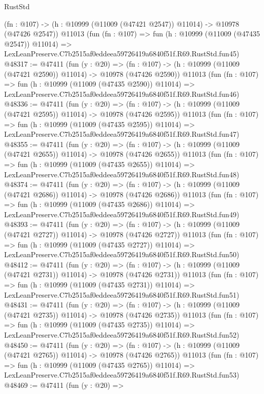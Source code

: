 \begin{lexlean}{RustStd}
\begin{coremodule}
    (fn : @107) -> (h : @10999 (@11009 (@47421 @2547)) @11014) -> @10978 (@47426 @2547))
    @11013
    (fun (fn : @107) =>
    fun (h : @10999 (@11009 (@47435 @2547)) @11014) =>
    LexLeanPreserve.C7b2515af0eddeea59726419a6840f51f.R69.RustStd.fun45)
@48317 := @47411
    (fun (y : @20) =>
    (fn : @107) -> (h : @10999 (@11009 (@47421 @2590)) @11014) -> @10978 (@47426 @2590))
    @11013
    (fun (fn : @107) =>
    fun (h : @10999 (@11009 (@47435 @2590)) @11014) =>
    LexLeanPreserve.C7b2515af0eddeea59726419a6840f51f.R69.RustStd.fun46)
@48336 := @47411
    (fun (y : @20) =>
    (fn : @107) -> (h : @10999 (@11009 (@47421 @2595)) @11014) -> @10978 (@47426 @2595))
    @11013
    (fun (fn : @107) =>
    fun (h : @10999 (@11009 (@47435 @2595)) @11014) =>
    LexLeanPreserve.C7b2515af0eddeea59726419a6840f51f.R69.RustStd.fun47)
@48355 := @47411
    (fun (y : @20) =>
    (fn : @107) -> (h : @10999 (@11009 (@47421 @2655)) @11014) -> @10978 (@47426 @2655))
    @11013
    (fun (fn : @107) =>
    fun (h : @10999 (@11009 (@47435 @2655)) @11014) =>
    LexLeanPreserve.C7b2515af0eddeea59726419a6840f51f.R69.RustStd.fun48)
@48374 := @47411
    (fun (y : @20) =>
    (fn : @107) -> (h : @10999 (@11009 (@47421 @2686)) @11014) -> @10978 (@47426 @2686))
    @11013
    (fun (fn : @107) =>
    fun (h : @10999 (@11009 (@47435 @2686)) @11014) =>
    LexLeanPreserve.C7b2515af0eddeea59726419a6840f51f.R69.RustStd.fun49)
@48393 := @47411
    (fun (y : @20) =>
    (fn : @107) -> (h : @10999 (@11009 (@47421 @2727)) @11014) -> @10978 (@47426 @2727))
    @11013
    (fun (fn : @107) =>
    fun (h : @10999 (@11009 (@47435 @2727)) @11014) =>
    LexLeanPreserve.C7b2515af0eddeea59726419a6840f51f.R69.RustStd.fun50)
@48412 := @47411
    (fun (y : @20) =>
    (fn : @107) -> (h : @10999 (@11009 (@47421 @2731)) @11014) -> @10978 (@47426 @2731))
    @11013
    (fun (fn : @107) =>
    fun (h : @10999 (@11009 (@47435 @2731)) @11014) =>
    LexLeanPreserve.C7b2515af0eddeea59726419a6840f51f.R69.RustStd.fun51)
@48431 := @47411
    (fun (y : @20) =>
    (fn : @107) -> (h : @10999 (@11009 (@47421 @2735)) @11014) -> @10978 (@47426 @2735))
    @11013
    (fun (fn : @107) =>
    fun (h : @10999 (@11009 (@47435 @2735)) @11014) =>
    LexLeanPreserve.C7b2515af0eddeea59726419a6840f51f.R69.RustStd.fun52)
@48450 := @47411
    (fun (y : @20) =>
    (fn : @107) -> (h : @10999 (@11009 (@47421 @2765)) @11014) -> @10978 (@47426 @2765))
    @11013
    (fun (fn : @107) =>
    fun (h : @10999 (@11009 (@47435 @2765)) @11014) =>
    LexLeanPreserve.C7b2515af0eddeea59726419a6840f51f.R69.RustStd.fun53)
@48469 := @47411
    (fun (y : @20) =>

\end{coremodule}
\end{lexlean}
